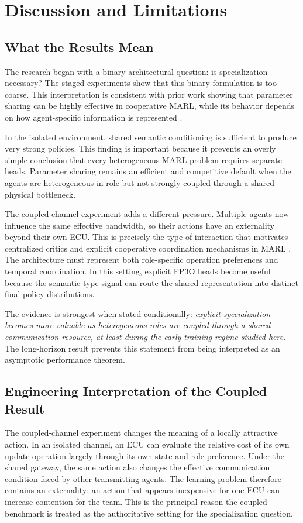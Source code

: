 \documentclass{iutbscthesis}
\begin{document}
\chapter{Discussion and Limitations}

\section{What the Results Mean}
The research began with a binary architectural question: is specialization necessary? The staged experiments show that this binary formulation is too coarse. This interpretation is consistent with prior work showing that parameter sharing can be highly effective in cooperative MARL, while its behavior depends on how agent-specific information is represented \parencite{yu2022surprising,terry2020revisiting}.

In the isolated environment, shared semantic conditioning is sufficient to produce very strong policies. This finding is important because it prevents an overly simple conclusion that every heterogeneous MARL problem requires separate heads. Parameter sharing remains an efficient and competitive default when the agents are heterogeneous in role but not strongly coupled through a shared physical bottleneck.

The coupled-channel experiment adds a different pressure. Multiple agents now influence the same effective bandwidth, so their actions have an externality beyond their own ECU. This is precisely the type of interaction that motivates centralized critics and explicit cooperative coordination mechanisms in MARL \parencite{lowe2017maddpg,foerster2018coma,yu2022surprising}. The architecture must represent both role-specific operation preferences and temporal coordination. In this setting, explicit FP3O heads become useful because the semantic type signal can route the shared representation into distinct final policy distributions.

The evidence is strongest when stated conditionally: \emph{explicit specialization becomes more valuable as heterogeneous roles are coupled through a shared communication resource, at least during the early training regime studied here}. The long-horizon result prevents this statement from being interpreted as an asymptotic performance theorem.


\section{Engineering Interpretation of the Coupled Result}
The coupled-channel experiment changes the meaning of a locally attractive action. In an isolated channel, an ECU can evaluate the relative cost of its own update operation largely through its own state and role preference. Under the shared gateway, the same action also changes the effective communication condition faced by other transmitting agents. The learning problem therefore contains an externality: an action that appears inexpensive for one ECU can increase contention for the team. This is the principal reason the coupled benchmark is treated as the authoritative setting for the specialization question.
\end{document}
